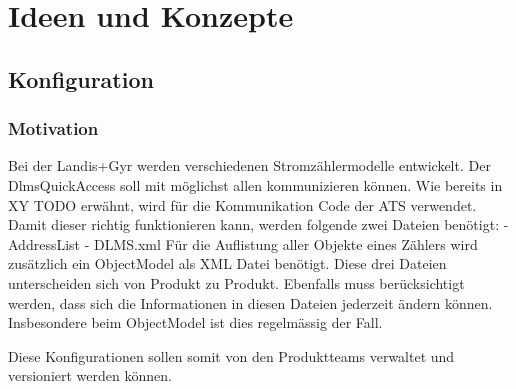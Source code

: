 \chapter{Ideen und Konzepte}




\section{Konfiguration}
\subsection{Motivation}
Bei der Landis+Gyr werden verschiedenen Stromzählermodelle entwickelt. Der DlmsQuickAccess soll mit möglichst allen kommunizieren können.
Wie bereits in XY TODO erwähnt, wird für die Kommunikation Code der ATS verwendet.
Damit dieser richtig funktionieren kann, werden folgende zwei Dateien benötigt:
- AddressList
- DLMS.xml
Für die Auflistung aller Objekte eines Zählers wird zusätzlich ein ObjectModel als XML Datei benötigt.
Diese drei Dateien unterscheiden sich von Produkt zu Produkt. Ebenfalls muss berücksichtigt werden, dass sich die Informationen in diesen Dateien jederzeit ändern können.
Insbesondere beim ObjectModel ist dies regelmässig der Fall.

Diese Konfigurationen sollen somit von den Produktteams verwaltet und versioniert werden können.

